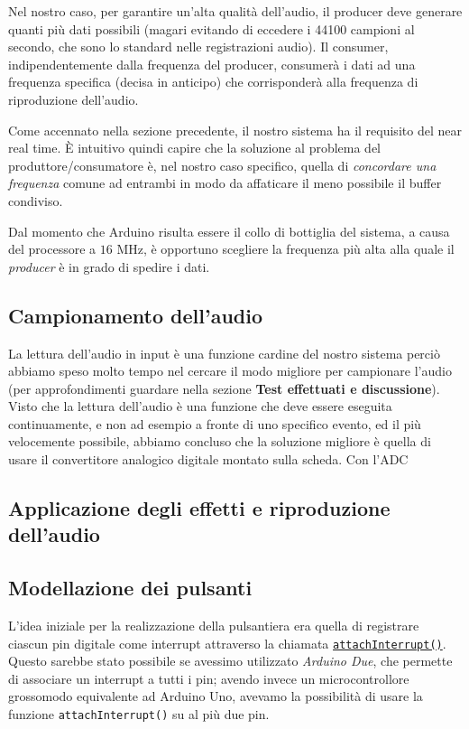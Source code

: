 \documentclass[a4paper,11pt]{article}
\begin{document}
Nel nostro caso, per garantire un'alta qualità dell'audio, il producer deve generare quanti più dati possibili (magari evitando di eccedere i \num{44100} campioni al secondo, che sono lo standard nelle registrazioni audio). Il consumer, indipendentemente dalla frequenza del producer, consumerà i dati ad una frequenza specifica (decisa in anticipo) che corrisponderà alla frequenza di riproduzione dell'audio.

Come accennato nella sezione precedente, il nostro sistema ha il requisito del near real time. È intuitivo quindi capire che la soluzione al problema del produttore/consumatore è, nel nostro caso specifico, quella di \textit{concordare una frequenza} comune ad entrambi in modo da affaticare il meno possibile il buffer condiviso.

Dal momento che Arduino risulta essere il collo di bottiglia del sistema, a causa del processore a $16$ MHz, è opportuno scegliere la frequenza più alta alla quale il \textit{producer} è in grado di spedire i dati.

\subsection{Campionamento dell'audio}
La lettura dell'audio in input è una funzione cardine del nostro sistema perciò abbiamo speso molto tempo nel cercare il modo migliore per campionare l'audio (per approfondimenti guardare nella sezione \textbf{Test effettuati e discussione}). Visto che la lettura dell'audio è una funzione che deve essere eseguita continuamente, e non ad esempio a fronte di uno specifico evento, ed il più velocemente possibile, abbiamo concluso che la soluzione migliore è quella di usare il convertitore analogico digitale montato sulla scheda. Con l'ADC

\subsection{Applicazione degli effetti e riproduzione dell'audio}

\subsection{Modellazione dei pulsanti}
L'idea iniziale per la realizzazione della pulsantiera era quella di registrare ciascun pin digitale come interrupt attraverso la chiamata \href{http://www.arduino.cc/en/Reference/AttachInterrupt}{\texttt{attachInterrupt()}}. Questo sarebbe stato possibile se avessimo utilizzato \emph{Arduino Due}, che permette di associare un interrupt a tutti i pin; avendo invece un microcontrollore grossomodo equivalente ad Arduino Uno, avevamo la possibilità di usare la funzione \texttt{attachInterrupt()} su al più due pin.
\end{document}
